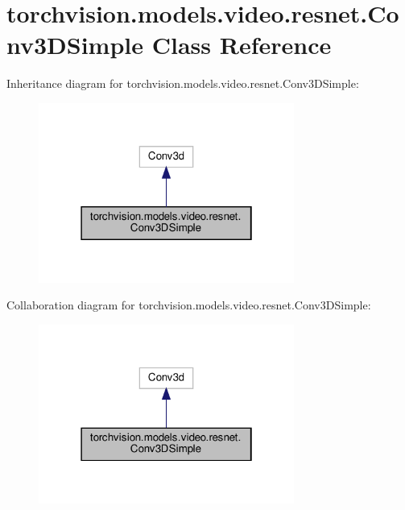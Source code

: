 \hypertarget{classtorchvision_1_1models_1_1video_1_1resnet_1_1Conv3DSimple}{}\section{torchvision.\+models.\+video.\+resnet.\+Conv3\+D\+Simple Class Reference}
\label{classtorchvision_1_1models_1_1video_1_1resnet_1_1Conv3DSimple}


Inheritance diagram for torchvision.\+models.\+video.\+resnet.\+Conv3\+D\+Simple\+:
\nopagebreak
\begin{figure}[H]
\begin{center}
\leavevmode
\includegraphics[width=238pt]{classtorchvision_1_1models_1_1video_1_1resnet_1_1Conv3DSimple__inherit__graph}
\end{center}
\end{figure}


Collaboration diagram for torchvision.\+models.\+video.\+resnet.\+Conv3\+D\+Simple\+:
\nopagebreak
\begin{figure}[H]
\begin{center}
\leavevmode
\includegraphics[width=238pt]{classtorchvision_1_1models_1_1video_1_1resnet_1_1Conv3DSimple__coll__graph}
\end{center}
\end{figure}
